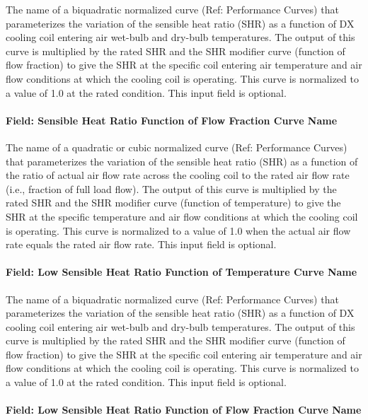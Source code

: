 The name of a biquadratic normalized curve (Ref: Performance Curves) that parameterizes the variation of the sensible heat ratio (SHR) as a function of DX cooling coil entering air wet-bulb and dry-bulb temperatures. The output of this curve is multiplied by the rated SHR and the SHR modifier curve (function of flow fraction) to give the SHR at the specific coil entering air temperature and air flow conditions at which the cooling coil is operating. This curve is normalized to a value of 1.0 at the rated condition. This input field is optional.

\paragraph{Field: Sensible Heat Ratio Function of Flow Fraction Curve Name}\label{field-sensible-heat-ratio-function-of-flow-fraction-curve-name-1}

The name of a quadratic or cubic normalized curve (Ref: Performance Curves) that parameterizes the variation of the sensible heat ratio (SHR) as a function of the ratio of actual air flow rate across the cooling coil to the rated air flow rate (i.e., fraction of full load flow). The output of this curve is multiplied by the rated SHR and the SHR modifier curve (function of temperature) to give the SHR at the specific temperature and air flow conditions at which the cooling coil is operating. This curve is normalized to a value of 1.0 when the actual air flow rate equals the rated air flow rate. This input field is optional.

\paragraph{Field: Low Sensible Heat Ratio Function of Temperature Curve Name}\label{field-low-sensible-heat-ratio-function-of-temperature-curve-name}

The name of a biquadratic normalized curve (Ref: Performance Curves) that parameterizes the variation of the sensible heat ratio (SHR) as a function of DX cooling coil entering air wet-bulb and dry-bulb temperatures. The output of this curve is multiplied by the rated SHR and the SHR modifier curve (function of flow fraction) to give the SHR at the specific coil entering air temperature and air flow conditions at which the cooling coil is operating. This curve is normalized to a value of 1.0 at the rated condition. This input field is optional.

\paragraph{Field: Low Sensible Heat Ratio Function of Flow Fraction Curve Name}\label{field-low-sensible-heat-ratio-function-of-flow-fraction-curve-name}

